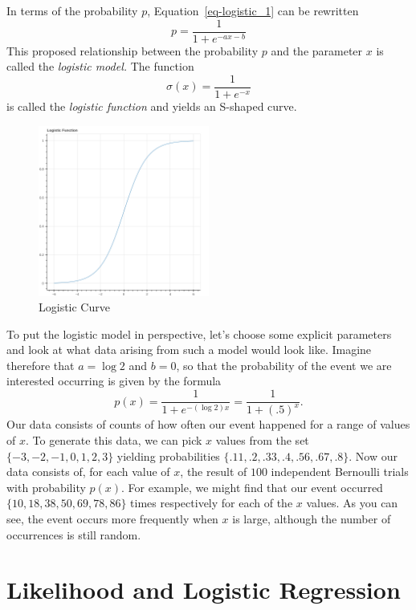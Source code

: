 \documentclass[
  11pt,
  letterpaper,
]{scrbook}
\theoremstyle{plain}
\theoremstyle{plain}
\theoremstyle{remark}
\begin{document}
In terms of the probability \(p\), Equation~\ref{eq-logistic_1} can be
rewritten \[
p = \frac{1}{1+e^{-ax-b}}
\] This proposed relationship between the probability \(p\) and the
parameter \(x\) is called the \emph{logistic model.} The function \[
\sigma(x) = \frac{1}{1+e^{-x}}
\] is called the \emph{logistic function} and yields an S-shaped curve.

\begin{figure}

{\centering \includegraphics[width=0.5\textwidth,height=\textheight]{chapters/img/logistic_curve.png}

}

\caption{\label{fig-logistic_curve}Logistic Curve}

\end{figure}

To put the logistic model in perspective, let's choose some explicit
parameters and look at what data arising from such a model would look
like. Imagine therefore that \(a=\log 2\) and \(b=0\), so that the
probability of the event we are interested occurring is given by the
formula \[
p(x) = \frac{1}{1+e^{-(\log 2)x}} = \frac{1}{1+(.5)^x}.
\] Our data consists of counts of how often our event happened for a
range of values of \(x\). To generate this data, we can pick \(x\)
values from the set \(\{-3,-2,-1,0,1,2,3\}\) yielding probabilities
\(\{.11,.2,.33,.4,.56,.67,.8\}\). Now our data consists of, for each
value of \(x\), the result of \(100\) independent Bernoulli trials with
probability \(p(x)\). For example, we might find that our event occurred
\(\{10, 18, 38, 50, 69, 78, 86\}\) times respectively for each of the
\(x\) values. As you can see, the event occurs more frequently when
\(x\) is large, although the number of occurrences is still random.

\hypertarget{likelihood-and-logistic-regression}{%
\section{Likelihood and Logistic
Regression}\label{likelihood-and-logistic-regression}}
\end{document}

